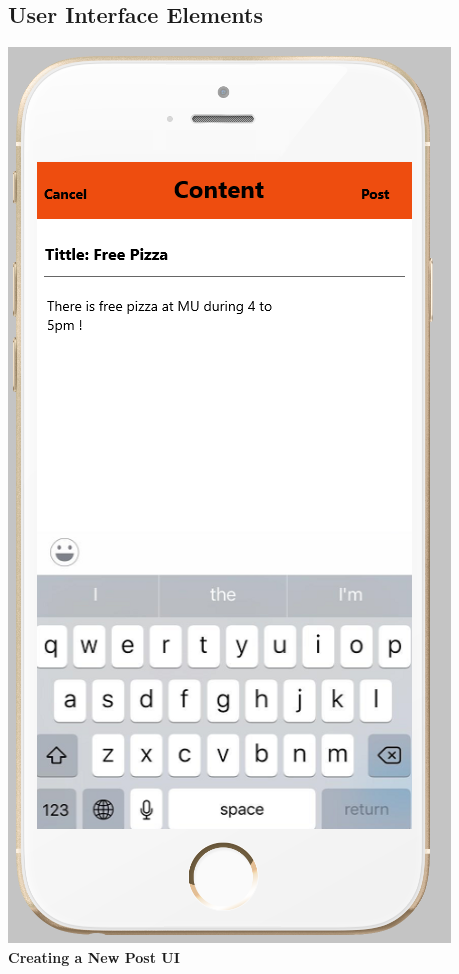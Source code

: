 \documentclass[12pt]{article}
\begin{document}
\subsection{User Interface Elements}
\begin{center}
\includegraphics[scale=0.30]{img/ui/post}\linebreak
\textbf{Creating a New Post UI}
  \end{center}
\end{document}
